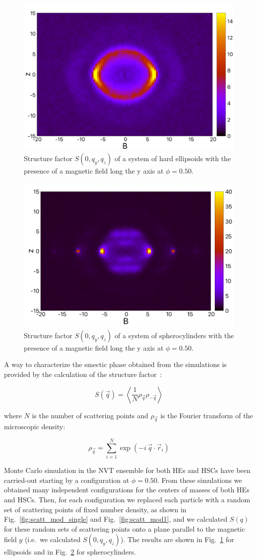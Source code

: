 \documentclass[aip,graphicx]{revtex4-1} %
\begin{document}
\begin{figure}
    \centering
    \includegraphics[width=0.5\columnwidth]{Syz_B_HE.png}
    \caption{Structure factor $S(0, q_y, q_z)$ of a system of hard ellipsoids with the presence of a magnetic field long the y axis at $\phi=0.50$.}\label{fig:Syz_B_HE}
\end{figure}

\begin{figure}
    \centering
    \includegraphics[width=0.5\columnwidth]{Syz_B.png}
    \caption{Structure factor $S(0, q_y, q_z)$ of a system of spherocylinders with the presence of a magnetic field long the y axis at $\phi=0.50$.}\label{fig:Syz_B_HSC}
\end{figure}

A way to characterize the smectic phase obtained from the simulations is provided by the calculation of the structure factor~\cite{Hansen_McDonald}:

\begin{equation}\label{eq:S_q}
    S( \vec{q} ) = \left\langle \frac{1}{N} \rho_{\vec{q}} \rho_{-\vec{q}} \right\rangle 
\end{equation}

where $N$ is the number of scattering points and $\rho_{\vec{q}}$ is the Fourier transform of the microscopic density:

\begin{equation}
    \rho_{\vec{q}} = \sum_{i=1}^N \exp(-i\, \vec{q} \cdot \vec{r}_i)
\end{equation}

Monte Carlo simulation in the NVT ensemble for both HEs and HSCs have been carried-out 
starting by a configuration at $\phi = 0.50$.
From these simulations we obtained many independent configurations for the centers of masses of both HEs and HSCs. 
Then, for each configuration we replaced each particle with a random set of scattering points 
of fixed number density, as shown in Fig.~\ref{fig:scatt_mod_single} and Fig.~\ref{fig:scatt_mod1}, and we calculated $S(q)$ 
for these random sets of scattering points onto a plane parallel to the magnetic field $y$ (i.e.~we calculated $S(0, q_y, q_z)$). 
The results are shown in Fig.~\ref{fig:Syz_B_HE} for ellipsoids and in Fig.~\ref{fig:Syz_B_HSC} for spherocylinders.
\end{document}
